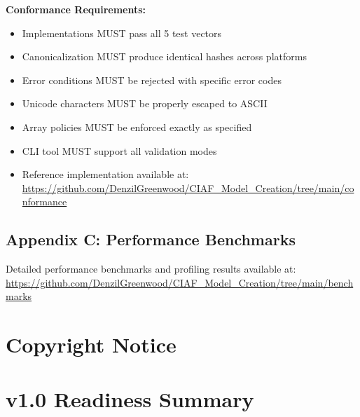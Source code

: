 \documentclass[12pt,a4paper]{article}
\begin{document}
\textbf{Conformance Requirements:}
\begin{itemize}
\item Implementations MUST pass all 5 test vectors
\item Canonicalization MUST produce identical hashes across platforms
\item Error conditions MUST be rejected with specific error codes
\item Unicode characters MUST be properly escaped to ASCII
\item Array policies MUST be enforced exactly as specified
\item CLI tool MUST support all validation modes
\item Reference implementation available at: \url{https://github.com/DenzilGreenwood/CIAF_Model_Creation/tree/main/conformance}
\end{itemize}

\subsection*{Appendix C: Performance Benchmarks}

Detailed performance benchmarks and profiling results available at: \\
\url{https://github.com/DenzilGreenwood/CIAF_Model_Creation/tree/main/benchmarks}

\section*{Copyright Notice}

\section*{v1.0 Readiness Summary}
\end{document}
